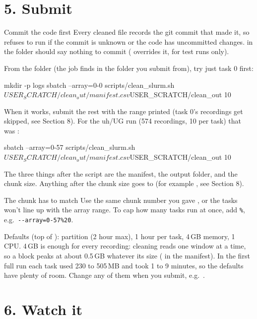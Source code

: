 \section{5. Submit}
\begin{careful}{Commit the code first}
Every cleaned file records the git commit that made it, so  refuses to run if the commit is unknown or the code has uncommitted changes.  in the  folder should say nothing to commit ( overrides it, for test runs only).
\end{careful}
From the  folder (the job finds  in the folder you submit from), try just task 0 first:
\begin{codebox}
mkdir -p logs
sbatch --array=0-0 scripts/clean_slurm.sh $USER_SCRATCH/clean_out/manifest.csv $USER_SCRATCH/clean_out 10
\end{codebox}
When it works, submit the rest with the range  printed (task 0's recordings get skipped, see Section 8). For the uh/UG run (574 recordings, 10 per task) that was :
\begin{codebox}
sbatch --array=0-57 scripts/clean_slurm.sh $USER_SCRATCH/clean_out/manifest.csv $USER_SCRATCH/clean_out 10
\end{codebox}
The three things after the script are the manifest, the output folder, and the chunk size. Anything after the chunk size goes to  (for example , see Section 8).
\begin{careful}{The chunk has to match}
Use the same chunk number you gave , or the tasks won't line up with the array range. To cap how many tasks run at once, add \texttt{\%}, e.g.\ \texttt{-{}-array=0-57\%20}.
\end{careful}
Defaults (top of ):  partition (2 hour max), 1 hour per task, 4\,GB memory, 1 CPU. 4\,GB is enough for every recording: cleaning reads one window at a time, so a block peaks at about 0.5\,GB whatever its size ( in the manifest). In the first full run each task used 230 to 505\,MB and took 1 to 9 minutes, so the defaults have plenty of room. Change any of them when you submit, e.g.\ .

\section{6. Watch it}

